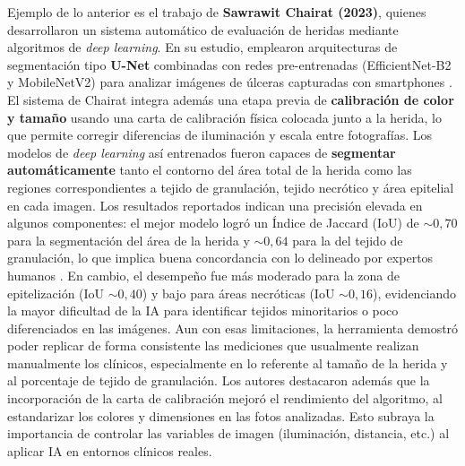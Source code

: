 Ejemplo de lo anterior es el trabajo de \textbf{Sawrawit Chairat  (2023)}, quienes desarrollaron un sistema automático de evaluación de heridas mediante algoritmos de \textit{deep learning}. En su estudio, emplearon arquitecturas de segmentación tipo \textbf{U-Net} combinadas con redes pre-entrenadas (EfficientNet-B2 y MobileNetV2) para analizar imágenes de úlceras capturadas con smartphones \cite{healthcare11020273}. El sistema de Chairat  integra además una etapa previa de \textbf{calibración de color y tamaño} usando una carta de calibración física colocada junto a la herida, lo que permite corregir diferencias de iluminación y escala entre fotografías. Los modelos de \textit{deep learning} así entrenados fueron capaces de \textbf{segmentar automáticamente} tanto el contorno del área total de la herida como las regiones correspondientes a tejido de granulación, tejido necrótico y área epitelial en cada imagen. 
Los resultados reportados indican una precisión elevada en algunos componentes: el mejor modelo logró un Índice de Jaccard (IoU) de  $\sim 0,70$ para la segmentación del área de la herida y  $\sim 0,64$ para la del tejido de granulación, lo que implica buena concordancia con lo delineado por expertos humanos \cite{Shi2014}. 
En cambio, el desempeño fue más moderado para la zona de epitelización (IoU  $\sim 0,40$) y bajo para áreas necróticas (IoU  $\sim 0,16$), evidenciando la mayor dificultad de la IA para identificar tejidos minoritarios o poco diferenciados en las imágenes. Aun con esas limitaciones, la herramienta demostró poder replicar de forma consistente las mediciones que usualmente realizan manualmente los clínicos, especialmente en lo referente al tamaño de la herida y al porcentaje de tejido de granulación. Los autores destacaron además que la incorporación de la carta de calibración mejoró el rendimiento del algoritmo, al estandarizar los colores y dimensiones en las fotos analizadas. Esto subraya la importancia de controlar las variables de imagen (iluminación, distancia, etc.) al aplicar IA en entornos clínicos reales.

